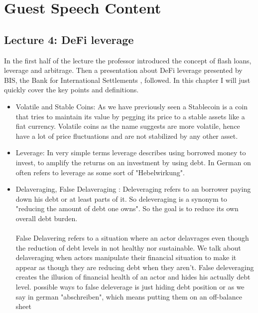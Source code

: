 \documentclass{article}
\begin{document}

\section{Guest Speech Content}

\subsection{Lecture 4: DeFi leverage }

In the first half of the lecture the professor introduced the concept of flash loans, leverage and arbitrage. Then a presentation about DeFi leverage presented by BIS, the Bank for International Settlements , followed. In this chapter I will just quickly cover the key points and definitions. 
\begin{itemize}


\item {Volatile and Stable Coins}: As we have previously seen a Stablecoin is a coin that tries to  maintain its value by pegging its price to a stable assets like a fiat currency. Volatile coins as the name suggests are more volatile, hence have a lot of price fluctuations and are not stabilized by any other asset.

\item {Leverage}: In very simple terms leverage describes using borrowed money to invest, to amplify the returns on an investment by using debt. In German on often refers to leverage as some sort of "Hebelwirkung". 


\item {Delaveraging, False Delaveraging }: Deleveraging refers to an borrower paying down his debt or at least parts of it. So deleveraging is a synonym to "reducing the amount of debt one owns". So the goal is to reduce its own overall debt burden.\\
\\
False Delavering refers to a situation where an actor delavrages even though the reduction of debt levels in not healthy nor sustainable. We talk about delaveraging when actors manipulate their financial situation to make it appear as though they are reducing debt when they aren't. False deleveraging creates the illusion of financial health of an actor and hides his actually debt level.
possible ways to false deleverage is just hiding debt position or as we say in german "abschreiben", which means putting them on an off-balance sheet 


\end{itemize}
\end{document}
